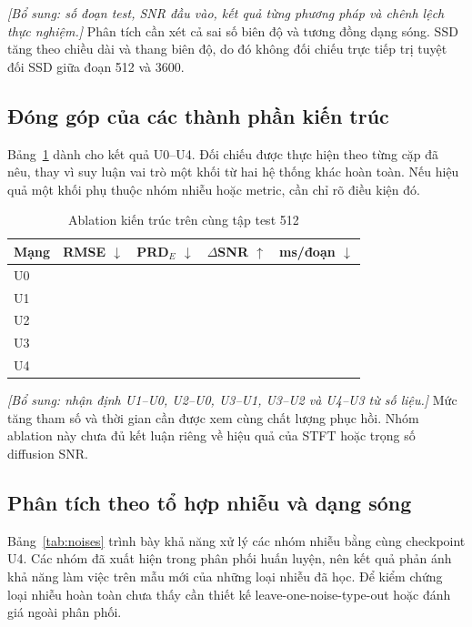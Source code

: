 \documentclass[conference]{IEEEtran}
\newcommand{\pending}{\textemdash}
\newcommand{\draftnote}[1]{\textit{[Bổ sung: #1]}}
\begin{document}
\draftnote{số đoạn test, SNR đầu vào, kết quả từng phương pháp và chênh lệch thực nghiệm.} Phân tích cần xét cả sai số biên độ và tương đồng dạng sóng. SSD tăng theo chiều dài và thang biên độ, do đó không đối chiếu trực tiếp trị tuyệt đối SSD giữa đoạn 512 và 3600.

\subsection{Đóng góp của các thành phần kiến trúc}
Bảng~\ref{tab:ablationresults} dành cho kết quả U0--U4. Đối chiếu được thực hiện theo từng cặp đã nêu, thay vì suy luận vai trò một khối từ hai hệ thống khác hoàn toàn. Nếu hiệu quả một khối phụ thuộc nhóm nhiễu hoặc metric, cần chỉ rõ điều kiện đó.

\begin{table}[t]
 \caption{Ablation kiến trúc trên cùng tập test 512}
 \label{tab:ablationresults}
 \centering\small
 \begin{tabular}{@{}lcccc@{}}
 \toprule
 Mạng & RMSE $\downarrow$ & PRD$_E$ $\downarrow$ & $\Delta$SNR $\uparrow$ & ms/đoạn $\downarrow$\\
 \midrule
 U0 & \pending & \pending & \pending & \pending\\
 U1 & \pending & \pending & \pending & \pending\\
 U2 & \pending & \pending & \pending & \pending\\
 U3 & \pending & \pending & \pending & \pending\\
 U4 & \pending & \pending & \pending & \pending\\
 \bottomrule
 \end{tabular}
\end{table}

\draftnote{nhận định U1--U0, U2--U0, U3--U1, U3--U2 và U4--U3 từ số liệu.} Mức tăng tham số và thời gian cần được xem cùng chất lượng phục hồi. Nhóm ablation này chưa đủ kết luận riêng về hiệu quả của STFT hoặc trọng số diffusion SNR.

\subsection{Phân tích theo tổ hợp nhiễu và dạng sóng}
Bảng~\ref{tab:noises} trình bày khả năng xử lý các nhóm nhiễu bằng cùng checkpoint U4. Các nhóm đã xuất hiện trong phân phối huấn luyện, nên kết quả phản ánh khả năng làm việc trên mẫu mới của những loại nhiễu đã học. Để kiểm chứng loại nhiễu hoàn toàn chưa thấy cần thiết kế leave-one-noise-type-out hoặc đánh giá ngoài phân phối.
\end{document}
